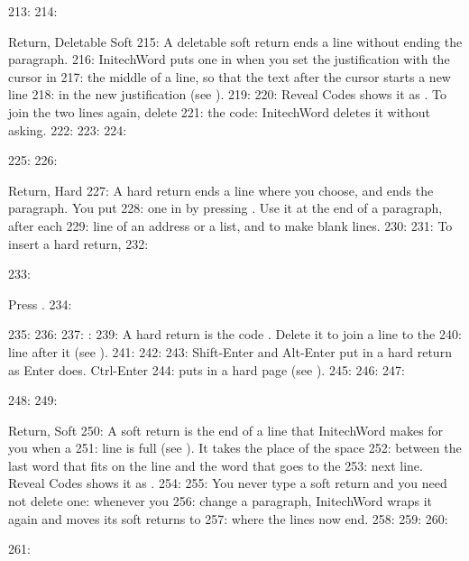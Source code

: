 213: 
214: \begin{Feature}{Return, Deletable Soft}
215: A deletable soft return ends a line without ending the paragraph.
216: InitechWord puts one in when you set the justification with the cursor in
217: the middle of a line, so that the text after the cursor starts a new line
218: in the new justification (see ).
219: 
220: Reveal Codes shows it as \Code{[DSRt]}.  To join the two lines again, delete
221: the code: InitechWord deletes it without asking.
222: 
223: 
224: \end{Feature}
225: 
226: \begin{Feature}{Return, Hard}
227: A hard return ends a line where you choose, and ends the paragraph.  You put
228: one in by pressing .  Use it at the end of a paragraph, after each
229: line of an address or a list, and to make blank lines.
230: 
231: To insert a hard return,
232: \begin{WPSteps}
233: \item Press .
234: \end{WPSteps}
235: 
236: 
237: : 
239: A hard return is the code \Code{[HRt]}.  Delete it to join a line to the
240: line after it (see ).
241: 
242: 
243: Shift-Enter and Alt-Enter put in a hard return as Enter does.  Ctrl-Enter
244: puts in a hard page (see ).
245: 
246: 
247: \end{Feature}
248: 
249: \begin{Feature}{Return, Soft}
250: A soft return is the end of a line that InitechWord makes for you when a
251: line is full (see ).  It takes the place of the space
252: between the last word that fits on the line and the word that goes to the
253: next line.  Reveal Codes shows it as \Code{[SRt]}.
254: 
255: You never type a soft return and you need not delete one: whenever you
256: change a paragraph, InitechWord wraps it again and moves its soft returns to
257: where the lines now end.
258: 
259: 
260: \end{Feature}
261: 
